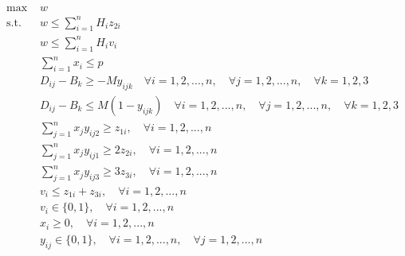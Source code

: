 \documentclass[14pt]{article}
\begin{document}
\begin{enumerate}
\begin{enumerate}
                        \begin{align*}
                              \text{max }  & w                                                                                                                         \\
                              \text{s.t. } & w \leq \sum_{i=1}^n H_iz_{2i}                                                                                             \\
                                           & w \leq \sum_{i=1}^n H_iv_{i}                                                                                              \\
                                           & \sum_{i=1}^n x_i \leq p                                                                                                   \\
                                           & D_{ij} - B_k \geq -My_{ijk} \quad \forall i = 1, 2, ..., n, \quad \forall j = 1, 2, ..., n, \quad \forall k = 1, 2, 3     \\
                                           & D_{ij} - B_k \leq M(1-y_{ijk}) \quad \forall i = 1, 2, ..., n, \quad \forall j = 1, 2, ..., n,  \quad \forall k = 1, 2, 3 \\
                                           & \sum_{j=1}^n x_jy_{ij2} \geq z_{1i}, \quad \forall i = 1, 2, ..., n                                                       \\
                                           & \sum_{j=1}^n x_jy_{ij1} \geq 2z_{2i}, \quad \forall i = 1, 2, ..., n                                                      \\
                                           & \sum_{j=1}^n x_jy_{ij3} \geq 3z_{3i}, \quad \forall i = 1, 2, ..., n                                                      \\
                                           & v_i \leq z_{1i}+z_{3i}, \quad \forall i = 1, 2, ..., n                                                                    \\
                                           & v_i \in \{0, 1\}, \quad \forall i = 1, 2, ..., n                                                                          \\
                                           & x_i \geq 0, \quad \forall i = 1, 2, ..., n                                                                                \\
                                           & y_{ij} \in \{0, 1\}, \quad \forall i = 1, 2, ..., n, \quad \forall j = 1, 2, ..., n                                       \\

\end{align*}
\end{enumerate}
\end{enumerate}
\end{document}
